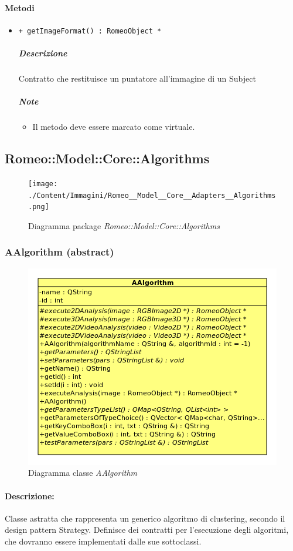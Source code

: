 	\paragraph{\color{black}Metodi}
		\begin{itemize}
			\item \color{blue} \verb!+ getImageFormat() : RomeoObject *!
			\color{black}
			\subparagraph{Descrizione} Contratto che restituisce un puntatore all’immagine di un Subject\g{}
			\subparagraph{Note}
			\begin{itemize}
				\item Il metodo deve essere marcato come virtuale.
			\end{itemize}
		\end{itemize}
\subsection{Romeo::Model::Core::Algorithms}
	\begin{figure} [!h]
		\centering
		\texttt{[image: ./Content/Immagini/Romeo\_\_Model\_\_Core\_\_Adapters\_\_Algorithms.png]}
		\caption{Diagramma package \textsl{Romeo::Model::Core::Algorithms}}
	\end{figure}
	\subsubsection{AAlgorithm (abstract)}
	\begin{figure}[!h]
		\centering
		\includegraphics[scale=2.75]{./Content/Immagini/modelCore/AAlgorithm}
		\caption{Diagramma classe \textsl{AAlgorithm}}
	\end{figure}
	\paragraph{Descrizione:} Classe astratta che rappresenta un generico algoritmo di clustering\g{}, secondo il design pattern Strategy. Definisce dei contratti per l’esecuzione degli algoritmi, che dovranno essere implementati dalle sue sottoclassi.
